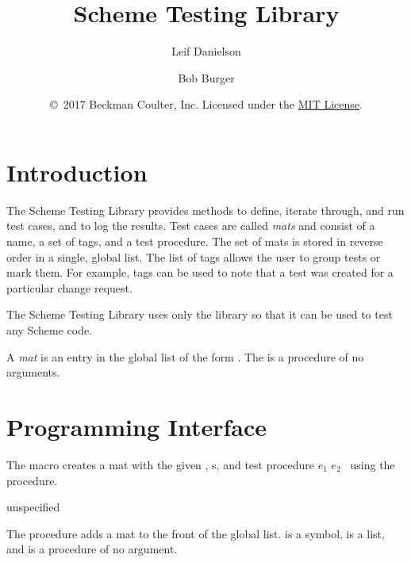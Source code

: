 \documentclass[letterpaper,11pt,twoside,final]{article}
\begin{document}
\title {Scheme Testing Library}
\author {Leif Danielson \and Bob Burger}
\date {\copyright\ 2017 Beckman Coulter, Inc.
  Licensed under the \href{https://opensource.org/licenses/MIT}{MIT License}.}
\maketitle

\section* {Introduction}

The Scheme Testing Library  provides methods to
define, iterate through, and run test cases, and to log the
results. Test cases are called \emph{mats} and consist of a name, a
set of tags, and a test procedure.  The set of mats is stored in
reverse order in a single, global list.  The list of tags allows the
user to group tests or mark them.  For example, tags can be used to
note that a test was created for a particular change request.

The Scheme Testing Library uses only the 
library so that it can be used to test any Scheme code.

A \emph{mat} is an entry in the global list of the form
. The  is a
procedure of no arguments.

\section* {Programming Interface}

\begin{syntax}
\end{syntax}
\expandsto{} 

The  macro creates a mat with the given ,
s, and test procedure $e_1$ $e_2$ \etc\ using the
 procedure.

\begin{procedure}
\end{procedure}
\returns{} unspecified

The  procedure adds a mat to the front of the global
list.  is a symbol,  is a list, and  is
a procedure of no argument.
\end{document}

